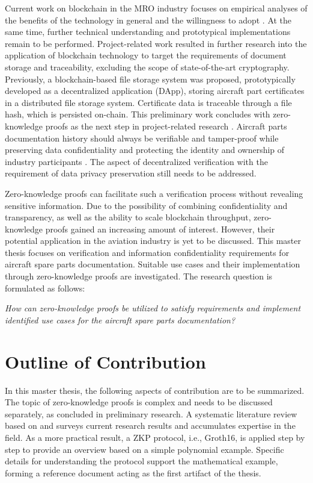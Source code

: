 Current work on blockchain in the MRO industry focuses on empirical analyses of the benefits of the technology in general and the willingness to adopt \citep{efthymiou}. At the same time, further technical understanding and prototypical implementations remain to be performed. Project-related work resulted in further research into the application of blockchain technology to target the requirements of document storage and traceability, excluding the scope of state-of-the-art cryptography. Previously, a blockchain-based file storage system was proposed, prototypically developed as a decentralized application (DApp), storing aircraft part certificates in a distributed file storage system. Certificate data is traceable through a file hash, which is persisted on-chain. This preliminary work concludes with zero-knowledge proofs as the next step in project-related research \citep{ZedelJ}. Aircraft parts documentation history should always be verifiable and tamper-proof while preserving data confidentiality and protecting the identity and ownership of industry participants \citep{Wickboldt2019BlockchainFW}. The aspect of decentralized verification with the requirement of data privacy preservation still needs to be addressed.

Zero-knowledge proofs can facilitate such a verification process without revealing sensitive information. Due to the possibility of combining confidentiality and transparency, as well as the ability to scale blockchain throughput, zero-knowledge proofs gained an increasing amount of interest. However, their potential application in the aviation industry is yet to be discussed. This master thesis focuses on verification and information confidentiality requirements for aircraft spare parts documentation. Suitable use cases and their implementation through zero-knowledge proofs are investigated. The research question is formulated as follows:

\begin{center}
\textit{How can zero-knowledge proofs be utilized to satisfy requirements and implement identified use cases for the aircraft spare parts documentation?}  
\end{center}

\section{Outline of Contribution}
In this master thesis, the following aspects of contribution are to be summarized. The topic of zero-knowledge proofs is complex and needs to be discussed separately, as concluded in preliminary research. A systematic literature review based on \citet{vomBrockeJan2019TDgs} and \citet{Webster2002AnalyzingTP} surveys current research results and accumulates expertise in the field. As a more practical result, a ZKP protocol, i.e., Groth16, is applied step by step to provide an overview based on a simple polynomial example. Specific details for understanding the protocol support the mathematical example, forming a reference document acting as the first artifact of the thesis.

